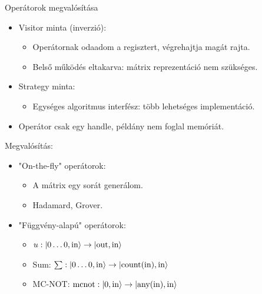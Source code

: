 \documentclass[aspectratio=169]{beamer}
\begin{document}
\begin{frame}{Operátorok megvalósítása}

\begin{itemize}
    \item Visitor minta (inverzió):
    \begin{itemize}
        \item Operátornak odaadom a regisztert, végrehajtja magát rajta.
        \item Belső működés eltakarva: mátrix reprezentáció nem szükséges.
    \end{itemize}
    \item Strategy minta:
    \begin{itemize}
    \item Egységes algoritmus interfész: több lehetséges implementáció.
    \end{itemize}
    \item Operátor csak egy handle, példány nem foglal memóriát.
\end{itemize}

Megvalósítás:    
\begin{itemize}
    \item "On-the-fly" operátorok:
    \begin{itemize}
        \item A mátrix egy sorát generálom.
        \item Hadamard, Grover.
    \end{itemize}
    \item "Függvény-alapú" operátorok:
    \begin{itemize}
        \item $u: \ket{0\dots{}0,\text{in}} \rightarrow \ket{\text{out},\text{in}}$
        \item Sum: $\sum: \ket{0\dots{}0,\text{in}} \rightarrow \ket{\text{count}(\text{in}),\text{in}}$
        \item MC-NOT: $\text{mcnot}: \ket{0,\text{in}} \rightarrow \ket{\text{any}(\text{in}),\text{in}}$
    \end{itemize}
\end{itemize}


\end{frame}
\end{document}

